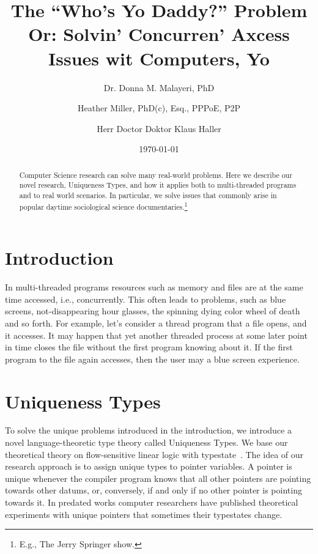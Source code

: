 \documentclass[10pt,twocolumn,letterpaper]{article}
\begin{document}
\title{The ``Who's Yo Daddy?'' Problem \\ \Large{Or: Solvin' Concurren' Axcess Issues wit Computers, Yo}}

\author{Dr. Donna M. Malayeri, PhD \and Heather Miller, PhD(c), Esq., PPPoE, P2P \and Herr Doctor Doktor Klaus Haller}
\date{\today}

\maketitle

\pagestyle{empty}
\thispagestyle{empty}

\begin{abstract}
Computer Science research can solve many real-world problems. Here we describe our novel research, Uniqueness Types, and how it applies both to multi-threaded programs and to real world scenarios. In particular, we solve issues that commonly arise in popular daytime sociological science documentaries.\footnote{E.g., The Jerry Springer show.}
\end{abstract}

\section{Introduction}
In multi-threaded programs resources such as memory and files are at the same time accessed, i.e., concurrently. This often leads to problems, such as blue screens, not-disappearing hour glasses, the spinning dying color wheel of death and so forth. For example, let's consider a thread program that a file opens, and it accesses. It may happen that yet another threaded process at some later point in time closes the file without the first program knowing about it. If the first program to the file again accesses, then the user may a blue screen experience.

\section{Uniqueness Types}
To solve the unique problems introduced in the introduction, we introduce a novel language-theoretic type theory called Uniqueness Types. We base our theoretical theory on flow-sensitive linear logic with typestate~\cite{CMUwork}. The idea of our research approach is to assign unique types to pointer variables. A pointer is unique whenever the compiler program knows that all other pointers are pointing towards other datums, or, conversely, if and only if no other pointer is pointing towards it. In predated works computer researchers have published theoretical experiments with unique pointers that sometimes their typestates change.
\end{document}
